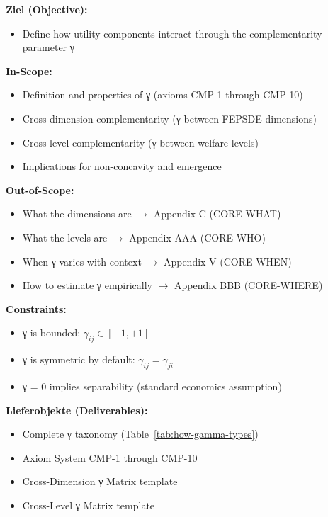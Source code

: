 \begin{tcolorbox}[
    colback=orange!5!white,
    colframe=orange!75!black,
    title={\textbf{Appendix Scope: Ziel / In-Scope / Out-of-Scope / Constraints}},
    fonttitle=\bfseries
]

\textbf{Ziel (Objective):}
\begin{itemize}[nosep]
    \item Define how utility components interact through the complementarity parameter γ
\end{itemize}

\textbf{In-Scope:}
\begin{itemize}[nosep]
    \item Definition and properties of γ (axioms CMP-1 through CMP-10)
    \item Cross-dimension complementarity (γ between FEPSDE dimensions)
    \item Cross-level complementarity (γ between welfare levels)
    \item Implications for non-concavity and emergence
\end{itemize}

\textbf{Out-of-Scope:}
\begin{itemize}[nosep]
    \item What the dimensions are $\rightarrow$ Appendix C (CORE-WHAT)
    \item What the levels are $\rightarrow$ Appendix AAA (CORE-WHO)
    \item When γ varies with context $\rightarrow$ Appendix V (CORE-WHEN)
    \item How to estimate γ empirically $\rightarrow$ Appendix BBB (CORE-WHERE)
\end{itemize}

\textbf{Constraints:}
\begin{itemize}[nosep]
    \item γ is bounded: $\gamma_{ij} \in [-1, +1]$
    \item γ is symmetric by default: $\gamma_{ij} = \gamma_{ji}$
    \item γ = 0 implies separability (standard economics assumption)
\end{itemize}

\textbf{Lieferobjekte (Deliverables):}
\begin{itemize}[nosep]
    \item Complete γ taxonomy (Table~\ref{tab:how-gamma-types})
    \item Axiom System CMP-1 through CMP-10
    \item Cross-Dimension γ Matrix template
    \item Cross-Level γ Matrix template
\end{itemize}

\end{tcolorbox}

